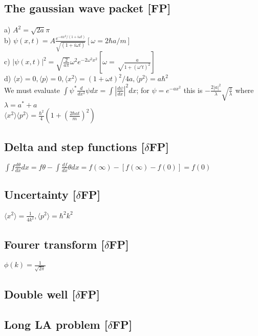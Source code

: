 \documentclass{article}
\newcommand{\<}{\langle}
\renewcommand{\>}{\rangle}
\begin{document}
\subsection{The gaussian wave packet [FP]}

a) $A^2 = \sqrt{2a}{\pi}$ \\
b) $\psi(x,t) = A\frac{e^{-ax^2/(1+i\omega t)}} {\sqrt{(1+i\omega t)}} [\omega = 2\hbar a / m] $ \\
c) $|\psi(x,t)|^2 = \sqrt{\frac{2}{a\pi}} \omega^2 e^{-2\omega^2x^2} [\omega = \sqrt\frac{a}{1+(\omega' t)^2}]$ \\
d) $\<x\> = 0, \<p\> = 0, \<x^2\> = (1+\omega t)^2 / 4a, \<p^2\> = a \hbar^2$
\\
We must evaluate $\int \psi^* \frac{d}{dx^2} \psi dx = \int |\frac{d\psi}{dx}|^2 dx$; for $\psi = e^{-ax^2}$ this is $-\frac{2|a|^2}{\lambda} \sqrt{\frac{\pi}{\lambda}}$ where $\lambda = a^* + a$
\\
$\<x^2\>\<p^2\> = \frac{\hbar^2}{4} (1 + (\frac{2\hbar a t}{m})^2)$

\subsection{}

\subsection{Delta and step functions [$\delta$FP]}

$\int f \frac{d\theta}{dx} dx = f\theta - \int \frac{df}{dx} \theta dx = f(\infty) - [f(\infty) - f(0)] = f(0) $

\subsection{Uncertainty [$\delta$FP]}

$\<x^2\> = \frac{1}{4k^2}, \<p^2\> = \hbar^2k^2$

\subsection{Fourer transform [$\delta$FP]}

$\phi(k) = \frac{1}{\sqrt{2\pi}}$

\subsection{Double well [$\delta$FP]}

\subsection{Long LA problem [$\delta$FP]}
\end{document}
